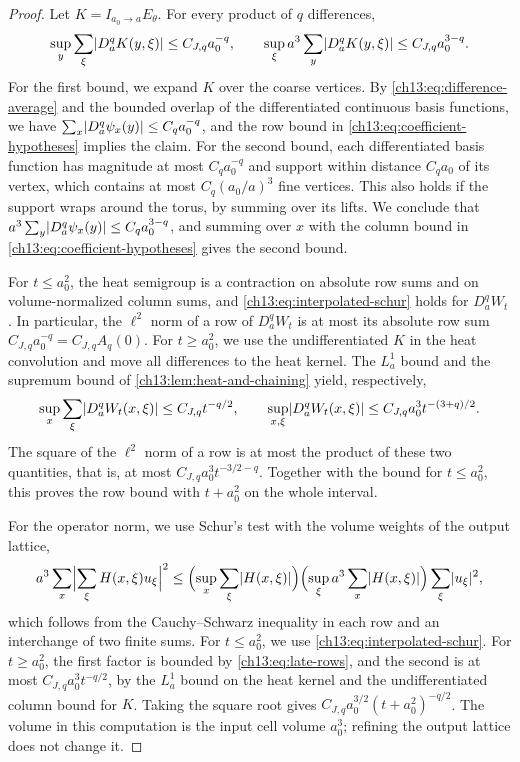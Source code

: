 \begin{proof}
Let $K=I_{a_0\to a}E_\theta$. For every product of $q$ differences,
\begin{equation}\label{ch13:eq:interpolated-schur}
 \sup_y\sum_\xi\lvert D_a^qK(y,\xi)\rvert\le C_{J,q}a_0^{-q},\qquad\sup_\xi a^3\sum_y\lvert D_a^qK(y,\xi)\rvert\le C_{J,q}a_0^{3-q}.
\end{equation}
For the first bound, we expand $K$ over the coarse vertices. By \eqref{ch13:eq:difference-average} and the bounded overlap of the differentiated continuous basis functions, we have $\sum_x\lvert D_a^q\psi_x(y)\rvert\le C_qa_0^{-q}$, and the row bound in \eqref{ch13:eq:coefficient-hypotheses} implies the claim. For the second bound, each differentiated basis function has magnitude at most $C_qa_0^{-q}$ and support within distance $C_qa_0$ of its vertex, which contains at most $C_q(a_0/a)^3$ fine vertices. This also holds if the support wraps around the torus, by summing over its lifts. We conclude that $a^3\sum_y\lvert D_a^q\psi_x(y)\rvert\le C_qa_0^{3-q}$, and summing over $x$ with the column bound in \eqref{ch13:eq:coefficient-hypotheses} gives the second bound.

For $t\le a_0^2$, the heat semigroup is a contraction on absolute row sums and on volume-normalized column sums, and \eqref{ch13:eq:interpolated-schur} holds for $D_a^qW_t$. In particular, the $\ell^2$ norm of a row of $D_a^qW_t$ is at most its absolute row sum $C_{J,q}a_0^{-q}=C_{J,q}A_q(0)$. For $t\ge a_0^2$, we use the undifferentiated $K$ in the heat convolution and move all differences to the heat kernel. The $L^1_a$ bound and the supremum bound of \cref{ch13:lem:heat-and-chaining} yield, respectively,
\begin{equation}\label{ch13:eq:late-rows}
 \sup_x\sum_\xi\lvert D_a^qW_t(x,\xi)\rvert\le C_{J,q}t^{-q/2},\qquad\sup_{x,\xi}\lvert D_a^qW_t(x,\xi)\rvert\le C_{J,q}a_0^3t^{-(3+q)/2}.
\end{equation}
The square of the $\ell^2$ norm of a row is at most the product of these two quantities, that is, at most $C_{J,q}a_0^3t^{-3/2-q}$. Together with the bound for $t\le a_0^2$, this proves the row bound with $t+a_0^2$ on the whole interval.

For the operator norm, we use Schur's test with the volume weights of the output lattice,
\begin{equation}\label{ch13:eq:physical-schur}
 a^3\sum_x\Bigl\lvert\sum_\xi H(x,\xi)u_\xi\Bigr\rvert^2
 \le\Bigl(\sup_x\sum_\xi\lvert H(x,\xi)\rvert\Bigr)\Bigl(\sup_\xi a^3\sum_x\lvert H(x,\xi)\rvert\Bigr)\sum_\xi\lvert u_\xi\rvert^2,
\end{equation}
which follows from the Cauchy--Schwarz inequality in each row and an interchange of two finite sums. For $t\le a_0^2$, we use \eqref{ch13:eq:interpolated-schur}. For $t\ge a_0^2$, the first factor is bounded by \eqref{ch13:eq:late-rows}, and the second is at most $C_{J,q}a_0^3t^{-q/2}$, by the $L^1_a$ bound on the heat kernel and the undifferentiated column bound for $K$. Taking the square root gives $C_{J,q}a_0^{3/2}(t+a_0^2)^{-q/2}$. The volume in this computation is the input cell volume $a_0^3$; refining the output lattice does not change it.


\end{proof}
